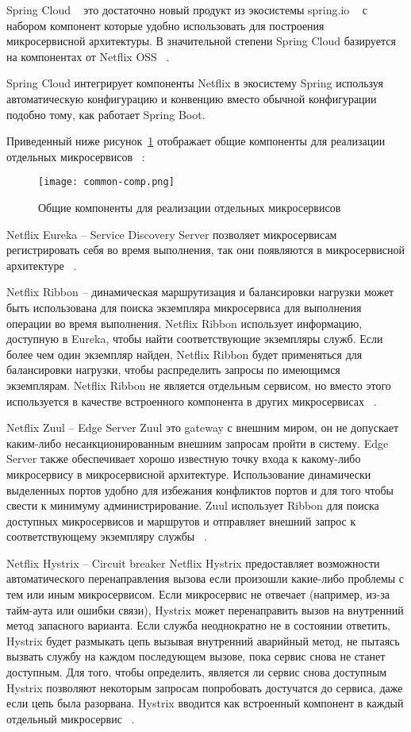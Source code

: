 Spring Cloud ~\cite{spring_cloud} это достаточно новый продукт из экосистемы spring.io ~\cite{spring_site} с набором компонент которые удобно использовать для построения микросервисной архитектуры. В значительной степени Spring Cloud базируется на компонентах от Netflix OSS ~\cite{netflix_oss}.

Spring Cloud интегрирует компоненты Netflix в экосистему Spring используя автоматическую конфигурацию и конвенцию вместо обычной конфигурации подобно тому, как работает Spring Boot.

Приведенный ниже рисунок~\ref{fig:common-comp} отображает общие компоненты для реализации отдельных микросервисов ~\cite{tut_micros}:

\begin{figure}[ht]
\centering
  \texttt{[image: common-comp.png]}  
  \caption{Общие компоненты для реализации отдельных микросервисов}
	\label{fig:common-comp}
\end{figure} 



Netflix Eureka -- Service Discovery Server позволяет микросервисам регистрировать себя во время выполнения, так они появляются в микросервисной архитектуре ~\cite{eureka}.

Netflix Ribbon -- динамическая маршрутизация и балансировки нагрузки может быть использована для поиска экземпляра микросервиса для выполнения операции во время выполнения. Netflix Ribbon использует информацию, доступную в Eureka, чтобы найти соответствующие экземпляры служб. Если более чем один экземпляр найден, Netflix Ribbon будет применяться для балансировки нагрузки, чтобы распределить запросы по имеющимся экземплярам. Netflix Ribbon не является отдельным сервисом, но вместо этого используется в качестве встроенного компонента в других микросервисах ~\cite{ribbon}.

Netflix Zuul -- Edge Server Zuul это gateway с внешним миром, он не допускает каким-либо несанкционированным внешним запросам пройти в систему.  Edge Server также обеспечивает хорошо известную точку входа к какому-либо микросервису в микросервисной архитектуре. Использование динамически выделенных портов удобно для избежания конфликтов портов и для того чтобы свести к минимуму администрирование. Zuul использует Ribbon для поиска доступных микросервисов и маршрутов и отправляет внешний запрос к соответствующему экземпляру службы ~\cite{zuul}. 

Netflix Hystrix -- Circuit breaker Netflix Hystrix предоставляет возможности автоматического перенаправления вызова если произошли какие-либо проблемы с тем или иным микросервисом. Если микросервис не отвечает (например, из-за тайм-аута или ошибки связи), Hystrix может перенаправить вызов на внутренний метод запасного варианта. Если служба неоднократно не в состоянии ответить, Hystrix будет размыкать цепь вызывая внутренний аварийный метод, не пытаясь вызвать службу на каждом последующем вызове, пока сервис снова не станет доступным. Для того, чтобы определить, является ли сервис снова доступным Hystrix позволяют некоторым запросам попробовать достучатся до сервиса, даже если цепь была разорвана. Hystrix вводится как встроенный компонент в каждый отдельный микросервис ~\cite{hystrix}.

